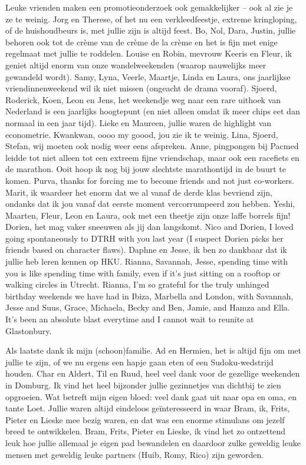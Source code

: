 \documentclass[11pt,twoside,]{book}
\begin{document}
Leuke vrienden maken een promotieonderzoek ook gemakkelijker -- ook al zie je ze
te weinig. Jorg en Therese,
of het nu een verkleedfeestje, extreme kringloping, of de huishoudbeurs is, met
jullie zijn is altijd feest. Bo, Nol, Dara, Justin, jullie behoren ook tot de
crème van de crème de la crème en het is fijn met enige regelmaat met jullie te
roddelen. Louise en Robin, mevrouw Keeris en Fleur, ik geniet altijd enorm van
onze wandelweekenden (waarop nauwelijks meer gewandeld wordt). Samy, Lyna, Veerle,
Maartje, Linda en Laura, ons jaarlijkse vriendinnenweekend wil ik niet missen
(ongeacht de drama vooraf). Sjoerd, Roderick, Koen, Leon en Jens, het weekendje
weg naar een
rare uithoek van Nederland is een jaarlijks hoogtepunt (en niet alleen omdat ik
meer chips eet dan normaal in een jaar tijd). Lieke en Maureen, jullie waren de
highlight van econometrie. Kwankwan, oooo my goood, jou zie ik te weinig. Lina,
Sjoerd, Stefan, wij moeten ook nodig weer eens afspreken. Anne, pingpongen bij
Pacmed leidde tot niet alleen tot een extreem fijne vriendschap, maar ook een
racefiets en de marathon. Ooit hoop ik nog bij jouw slechtste marathontijd in
de buurt te komen. Purva,
thanks for forcing me to become friends and not just co-workers. Marit,
ik waardeer het enorm dat we al vanaf de derde klas bevriend zijn, ondanks dat ik
jou vanaf dat eerste moment vercorrumpeerd zou hebben. Yeshi,
Maarten, Fleur, Leon en Laura, ook met een theetje zijn onze laffe borrels
fijn! Dorien, het mag vaker sneeuwen als jij dan langskomt. Nico
and Dorien, I loved going spontaneously to DTRH with you last year (I suspect
Dorien picks her friends based on character flaws). Daphne en Jesse, ik ben zo
dankbaar dat ik jullie heb leren kennen op HKU. Rianna, Savannah, Jesse, spending time with
you is like spending time with family, even if it's just sitting on a rooftop
or walking circles in Utrecht. Rianna, I'm so grateful for the truly unhinged
birthday weekends we have had in Ibiza, Marbella and London, with Savannah,
Jesse and Suus, Grace, Michaela, Becky and Ben, Jamie, and Hamza and Ella. It's been
an absolute blast everytime and I
cannot wait to reunite at Glastonbury.

Als laatste dank ik mijn (schoon)familie. Ad en Hermien, het is altijd fijn
om met jullie te zijn, of we nu ergens een hapje gaan eten of een Sudoku-wedstrijd
houden. Char en Aldert, Til en Ruud, heel veel dank voor de gezellige weekenden in
Domburg. Ik vind het heel bijzonder jullie gezinnetjes van dichtbij te zien
opgroeien. Wat betreft mijn eigen bloed: veel dank gaat uit naar opa en oma,
en tante Loet. Jullie waren altijd eindeloos geïnteresseerd in waar Bram, ik,
Frits, Pieter en Lieske mee bezig waren, en dat was een enorme stimulans om
jezelf breed te ontwikkelen. Bram, Frits, Pieter en Lieske, ik vind het zo
ontzettend leuk hoe jullie allemaal je eigen pad bewandelen en daardoor zulke
geweldig leuke mensen met geweldig leuke partners (Huib, Romy, Rico) zijn geworden.
\end{document}

